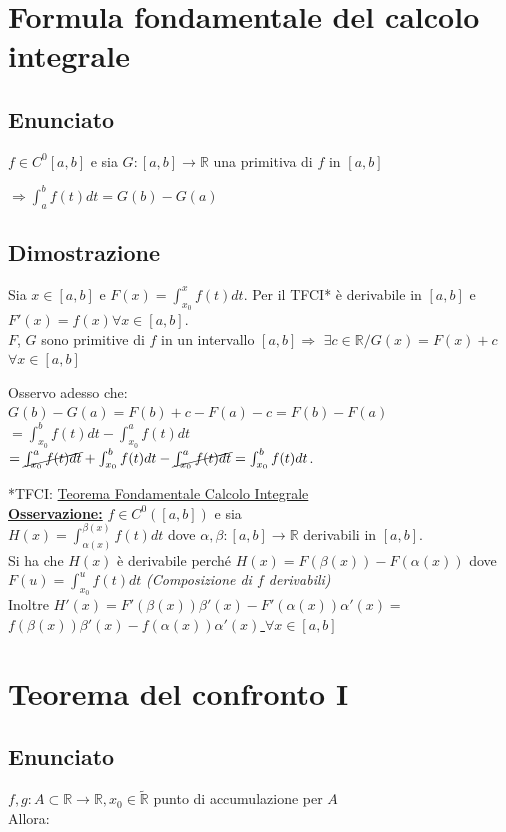 \documentclass{article}
\newcommand{\R}{\mathbb{R}}
\newcommand{\Rext}{\widetilde{\mathbb{R}}}
\newcommand{\vSpace}{\vspace{1em}}
\begin{document}
\begin{flushleft}
\newpage
\section{Formula fondamentale del calcolo integrale}
\subsection{Enunciato}
$f \in C^0[a,b]$ e sia $G : [a,b] \rightarrow {\R}$ una primitiva di $f$ in $[a,b]$
\\\begin{center}$\Rightarrow \int_{a}^{b}f(t)dt = G(b) - G(a)$\end{center}

\subsection{Dimostrazione}
Sia $x \in [a,b]$ e $F(x)= \int_{x_0}^{x}f(t)dt$. Per il TFCI* è derivabile in $[a,b]$ e $F'(x)=f(x) \forall x \in [a,b]$.
\\$F$, $G$ sono primitive di $f$ in un intervallo $[a,b] \Rightarrow$ $\exists c \in {\R} /G(x)=F(x)+c$ $\forall x \in [a,b]$
\begin{center}
    Osservo adesso che: $G(b) - G(a) = F(b)+c-F(a)-c=F(b)-F(a)$
    \\$= \int_{x_0}^{b}f(t)dt - \int_{x_0}^{a}f(t)dt$
    \\$= \cancel{\int_{x_0}^{a}f(t)dt} + \int_{x_0}^{b}f(t)dt - \cancel{\int_{x_0}^{a}f(t)dt} = \int_{x_0}^{b}f(t)dt$.
\end{center}
*TFCI: \hyperref[TFCI]{Teorema Fondamentale Calcolo Integrale}
\vSpace
\\\underline{\textbf{Osservazione:}} $f \in C^0 ([a,b])$ e sia
\\$H(x) = \int_{\alpha(x)}^{\beta(x)}f(t)dt$ dove $\alpha,\beta:[a,b]\rightarrow \R$ derivabili in $[a,b]$.
\\Si ha che $H(x)$ è derivabile perché $H(x)=F(\beta(x))-F(\alpha(x))$ dove $F(u)=\int_{x_0}^{u}f(t)dt$ \textit{(Composizione di $f$ derivabili)}
\\Inoltre $H'(x)=F'(\beta(x))\beta'(x) - F'(\alpha(x))\alpha'(x) = $ \underline{$f(\beta (x))\beta'(x)-f(\alpha(x))\alpha'(x)$ $\forall x \in [a,b]$}


\section{Teorema del confronto I}
\subsection{Enunciato}
$f, g: A \subset \R \rightarrow \R, x_0 \in \Rext$ punto di accumulazione per $A$
\\Allora: 


\end{flushleft}
\end{document}
